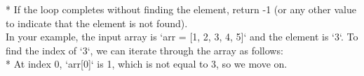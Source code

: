 \documentclass[preview]{standalone}
\begin{document}
* If the loop completes without finding the element, return -1 (or any other value to indicate that the element is not found).\\In your example, the input array is `arr = [1, 2, 3, 4, 5]` and the element is `3`. To find the index of `3`, we can iterate through the array as follows:\\* At index 0, `arr[0]` is 1, which is not equal to 3, so we move on.\\
\end{document}
